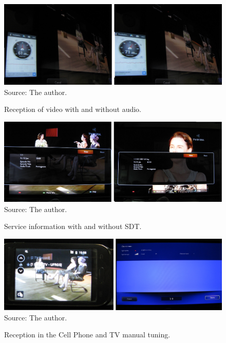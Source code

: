 \documentclass[
	12pt,				%
	openright,			%
	twoside,			%
	a4paper,			%
	brazil,
	french,				%
	english
	]{abntex2}
\begin{document}
\begin{figure}[!h]
\centering
\includegraphics[width=0.9\linewidth]{figuras/video_audio_both.jpg}
\\Source: The author.
\caption{Reception of video with and without audio.}
\label{fig:video_audio_both}
\end{figure}

\begin{figure}[!h]
\centering
\includegraphics[width=0.9\linewidth]{figuras/info_with_without_sdt.jpg}
\\Source: The author.
\caption{Service information with and without SDT.}
\label{fig:info_with_without_sdt}
\end{figure}

\begin{figure}[!h]
\centering
\includegraphics[width=0.9\linewidth]{figuras/cell_with_sdt.jpg}
\\Source: The author.
\caption{Reception in the Cell Phone and TV manual tuning.}
\label{fig:cell_with_sdt}
\end{figure}

%

\end{document}
